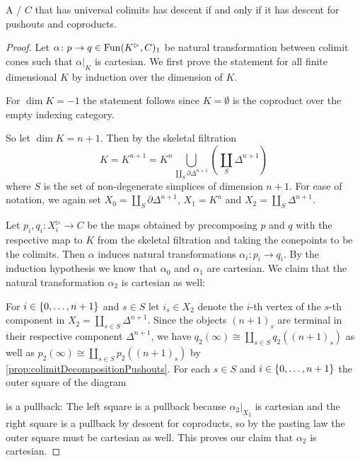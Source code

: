\begin{lemma}\label{lem:descentIffDescentPoAndCoprod}
    A \inftycat/ $C$ that has universal colimits has descent if and only if it has descent for pushouts and coproducts.
    \begin{proof}
        Let $\alpha\colon p\to q\in\operatorname{Fun}(K^{\rhd},C)_1$ be natural transformation between colimit cones such that $\alpha|_K$ is cartesian.
        We first prove the statement for all finite dimensional $K$ by induction over the dimension of $K$.

        For $\dim K=-1$ the statement follows since $K=\emptyset$ is the coproduct over the empty indexing category.

        So let $\dim K=n+1$.
        Then by the skeletal filtration
        \begin{equation*}
            K=K^{n+1}=K^n\bigcup\limits_{\coprod\limits_S \partial\Delta^{n+1}}\left(\coprod_S \Delta^{n+1}\right)
        \end{equation*}
        where $S$ is the set of non-degenerate simplices of dimension $n+1$.
        For ease of notation, we again set $X_{0}=\coprod\limits_S \partial\Delta^{n+1}$, $X_1=K^n$ and $X_2=\coprod\limits_S \Delta^{n+1}$.
        
        Let $p_i,q_i\colon X_i^{\rhd}\to C$ be the maps obtained by precomposing $p$ and $q$ with the respective map to $K$ from the skeletal filtration and taking the conepoints to be the colimits.
        Then $\alpha$ induces natural transformations $\alpha_i\colon p_i\to q_i$.
        By the induction hypothesis we know that $\alpha_0$ and $\alpha_1$ are cartesian.
        We claim that the natural transformation $\alpha_2$ is cartesian as well: 

        For $i\in\left\lbrace0,\ldots,n+1\right\rbrace$ and $s\in S$ let $i_s\in X_2$ denote the $i$-th vertex of the $s$-th component in $X_2=\coprod\limits_{s\in S} \Delta^{n+1}$.
        Since the objects $(n+1)_s$ are terminal in their respective component $\Delta^{n+1}$, we have $q_2(\infty)\cong\coprod\limits_{s\in S} q_2((n+1)_s)$ as well as $p_2(\infty)\cong\coprod\limits_{s\in S} p_2((n+1)_s)$ by \cref{prop:colimitDecompositionPushouts}.
        For each $s\in S$ and $i\in\left\lbrace0,\ldots,n+1\right\rbrace$ the outer square of the diagram
        \begin{center}
        \end{center}
        is a pullback: The left square is a pullback because $\alpha_2|_{X_2}$ is cartesian and the right square is a pullback by descent for coproducts, so by the pasting law the outer square must be cartesian as well.
        This proves our claim that $\alpha_2$ is cartesian.


\end{proof}
\end{lemma}
